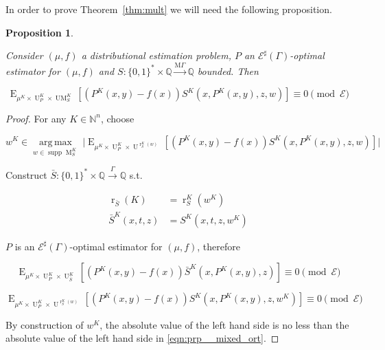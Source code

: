 \documentclass{article}
\numberwithin{equation}{section}
\theoremstyle{definition}
\theoremstyle{plain}
\newtheorem{proposition}{Proposition}[section]
\newcommand{\Bool}{\{0,1\}}
\newcommand{\Words}{{\Bool^*}}
\DeclareMathOperator{\Supp}{supp}
\DeclareMathOperator{\E}{E}
\DeclareMathOperator{\R}{r}
\DeclareMathOperator{\M}{M}
\DeclareMathOperator{\UM}{UM}
\DeclareMathOperator{\Un}{U}
\newcommand{\Argmax}[1]{\underset{#1}{\operatorname{arg\,max}}\,}
\newcommand{\Nats}{\mathbb{N}}
\newcommand{\Rats}{\mathbb{Q}}
\newcommand{\Abs}[1]{\lvert #1 \rvert}
\newcommand{\MGrow}{\mathrm{M}\Gamma}
\newcommand{\Fall}{\mathcal{E}}
\newcommand{\ESG}{\Fall^\sharp(\Gamma)}
\newcommand{\Scheme}{\xrightarrow{\Gamma}}
\newcommand{\MScheme}{\xrightarrow{\MGrow}}
\begin{document}
In order to prove Theorem~\ref{thm:mult} we will need the following proposition.

\begin{samepage}
\begin{proposition}
\label{prp:mixed_ort}

Consider $(\mu,f)$ a distributional estimation problem, $P$ an $\ESG$-optimal estimator for $(\mu,f)$ and $S: \Words \times \Rats \MScheme \Rats$ bounded. Then

\begin{equation}
\label{eqn:prp__mixed_ort}
\E_{\mu^{K} \times \Un_P^{K} \times \UM_S^{K}}[(P^{K}(x,y) - f(x))S^{K}(x,P^{K}(x,y),z,w)] \equiv 0 \pmod \Fall
\end{equation}

\end{proposition}
\end{samepage}

\begin{proof}

For any $K \in \Nats^n$, choose 

$$w^{K} \in \Argmax{w \in \Supp \M_S^{K}} \Abs{\E_{\mu^{K} \times \Un_P^{K} \times \Un^{\R_S^{K}(w)}}[(P^{K}(x,y) - f(x))S^{K}(x,P^{K}(x,y),z,w)]}$$

Construct $\bar{S}: \Words \times \Rats \Scheme \Rats$ s.t. 

\begin{align*}
\R_{\bar{S}}(K)&=\R_S^{K}(w^{K}) \\
\bar{S}^{K}(x,t,z)&=S^{K}(x,t,z,w^{K})
\end{align*}

$P$ is an $\ESG$-optimal estimator for $(\mu,f)$, therefore

$$\E_{\mu^{K} \times \Un_P^{K} \times \Un_{\bar{S}}^{K}}[(P^{K}(x,y) - f(x))\bar{S}^{K}(x,P^{K}(x,y),z)] \equiv 0 \pmod \Fall$$

$$\E_{\mu^{K} \times \Un_P^{K} \times \Un^{\R_S^{K}(w)}}[(P^{K}(x,y) - f(x))S^{K}(x,P^{K}(x,y),z,w^{K})] \equiv 0 \pmod \Fall$$

By construction of $w^{K}$, the absolute value of the left hand side is no less than the absolute value of the left hand side in \ref{eqn:prp__mixed_ort}.
\end{proof}
\end{document}
